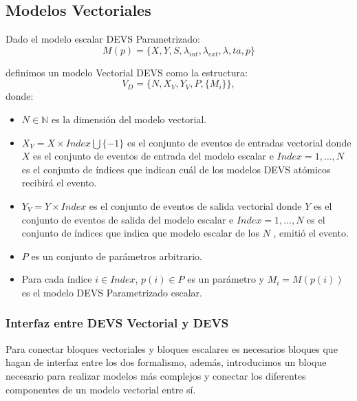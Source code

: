 	\subsection{Modelos Vectoriales}
	Dado el modelo escalar DEVS Parametrizado:
	\begin{equation}
		M (p) = \{X, Y, S, \lambda_{int} , \lambda_{ext} , \lambda, ta, p\}
		\end{equation}

		definimos un modelo Vectorial DEVS\cite{BKC12} como la estructura:
		\begin{equation}
		V_D = \{N, X_V, Y_V, P, \{M_i\}\},
		\end{equation}
		donde:
		\begin{itemize}
		\item $N \in \mathbb{N}$ es la dimensión del modelo vectorial.

		\item $X_V = X \times Index \bigcup \{-1\}$ es el conjunto de eventos de entradas vectorial donde $X$ es el conjunto de eventos de entrada del modelo 
		escalar e $Index = {1, \ldots , N }$ es el conjunto de índices que indican cuál de los modelos DEVS atómicos recibirá el evento.

		\item $Y_V = Y \times Index$ es el conjunto de eventos de salida vectorial donde $Y$ es el conjunto de eventos de salida del modelo escalar e 
		$Index = {1, \ldots , N }$ es el conjunto de índices que indica que modelo escalar de los $N$ , emitió el evento. 

		\item $P$ es un conjunto de parámetros arbitrario.

		\item Para cada índice $i \in Index$, $p(i) \in P$ es un parámetro y $M_i = M (p(i))$ es el modelo DEVS Parametrizado escalar.
	\end{itemize}

	\subsubsection{Interfaz entre DEVS Vectorial y DEVS}
	Para conectar bloques vectoriales y bloques escalares es necesarios bloques que hagan de interfaz entre los dos formalismo, además, introducimos 
	un bloque necesario para realizar modelos más complejos y conectar los diferentes componentes de un modelo vectorial entre sí.

